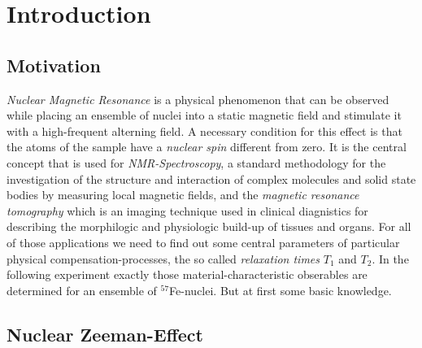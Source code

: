 \section{Introduction}
	\subsection{Motivation}
		\textit{Nuclear Magnetic Resonance} is a physical phenomenon that can be observed while placing an ensemble of nuclei into a static magnetic field and stimulate it with a high-frequent alterning field. A necessary condition for this effect is that the atoms of the sample have a \textit{nuclear spin} different from zero. It is the central concept that is used for \textit{NMR-Spectroscopy}, a standard methodology for the investigation of the structure and interaction of complex molecules and solid state bodies by measuring local magnetic fields, and the \textit{magnetic resonance tomography} which is an imaging technique used in clinical diagnistics for describing the morphilogic and physiologic build-up of tissues and organs. For all of those applications we need to find out some central parameters of particular physical compensation-processes, the so called \textit{relaxation times} $T_1$ and $T_2$. In the following experiment exactly those material-characteristic obserables are determined for an ensemble of $^57$Fe-nuclei. But at first some basic knowledge.
	\subsection{Nuclear Zeeman-Effect}